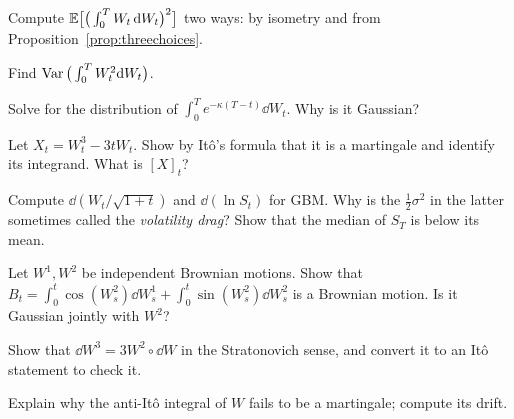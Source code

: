 \begin{exercises}
\item Compute $\mathbb{E}\big[\big(\int_0^TW_t\,\mathrm{d} W_t\big)^2\big]$ two ways: by isometry and from Proposition~\ref{prop:threechoices}.
\item Find $\operatorname{Var}\big(\int_0^T W_t^2\mathrm{d} W_t\big)$.
\item Solve for the distribution of $\int_0^T e^{-\kappa(T-t)}\dd W_t$. Why is it Gaussian?
\item Let $X_t=W_t^3-3tW_t$. Show by It\^o's formula that it is a martingale and identify its integrand. What is $[X]_t$?
\item Compute $\dd(W_t/\sqrt{1+t})$ and $\dd(\ln S_t)$ for GBM. Why is the $\tfrac12\sigma^2$ in the latter sometimes called the \emph{volatility drag}? Show that the median of $S_T$ is below its mean.
\item Let $W^1,W^2$ be independent Brownian motions. Show that $B_t=\int_0^t\cos(W^2_s)\dd W^1_s+\int_0^t\sin(W^2_s)\dd W^2_s$ is a Brownian motion. Is it Gaussian jointly with $W^2$?
\item Show that $\dd W^3=3W^2\circ\dd W$ in the Stratonovich sense, and convert it to an It\^o statement to check it.
\item Explain why the anti-It\^o integral of $W$ fails to be a martingale; compute its drift.
\end{exercises}
